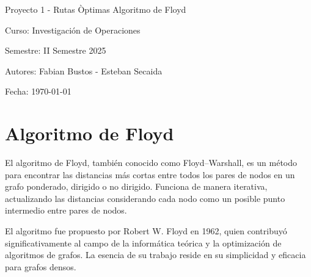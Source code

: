 \documentclass{article}
\begin{document}
\begin{titlepage}
  \centering
  \vfill
  {\Huge Proyecto 1 - Rutas Òptimas Algoritmo de Floyd}\par
  \vspace{1cm}
  {\Large Curso: Investigación de Operaciones}\par
  {\Large Semestre: II Semestre 2025}\par
  \vfill
  {\Large Autores: Fabian Bustos - Esteban Secaida}\par
  \vspace{1cm}
  {\large Fecha: \today}\par
  \vfill
\end{titlepage}

\section*{Algoritmo de Floyd}
El algoritmo de Floyd, también conocido como Floyd--Warshall, es un método para encontrar las distancias más cortas entre todos los pares de nodos en un grafo ponderado, dirigido o no dirigido. Funciona de manera iterativa, actualizando las distancias considerando cada nodo como un posible punto intermedio entre pares de nodos.

El algoritmo fue propuesto por Robert W. Floyd en 1962, quien contribuyó significativamente al campo de la informática teórica y la optimización de algoritmos de grafos. La esencia de su trabajo reside en su simplicidad y eficacia para grafos densos.
\end{document}
